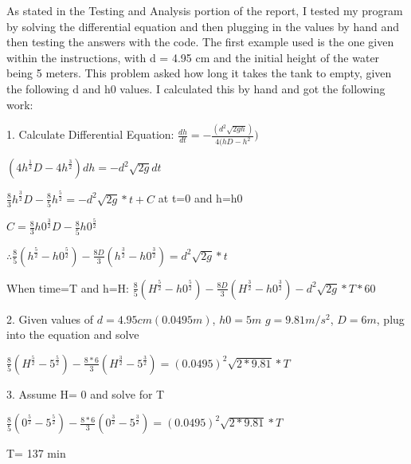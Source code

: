 \documentclass{article}
\begin{document}
{\color{black}  As stated in the Testing and Analysis portion of the report, I tested my program by solving the differential equation and then plugging in the values by hand and then testing the answers with the code.  The first example used is the one given within the instructions, with d = 4.95 cm and the initial height of the water being 5 meters.  This problem asked how long it takes the tank to empty, given the following d and h0 values.  I calculated this by hand and got the following work:
\par \medskip \par
1. Calculate Differential Equation:
$\frac{dh}{dt}=-\frac{(d^2\sqrt{2gh})}{4(hD-h^2})$
\par \medskip \par
$(4h^{\frac{1}{2}} D-4h^{\frac{3}{2}})dh= -d^{2} \sqrt{2g} dt$
\par \medskip \par
$\frac{8}{3} h^{\frac{3}{2}} D-\frac{8}{5} h^{\frac{5}{2}}=-d^2 \sqrt{2g}*t+C$ at t=0 and h=h0
\par \medskip \par
$C=\frac{8}{3} h0^{\frac{3}{2}} D-\frac{8}{5} h0^{\frac{5}{2}}$
\par \medskip \par
$\therefore \frac{8}{5} (h^{\frac{5}{2}}-h0^{\frac{5}{2}})-\frac{8D}{3} (h^{\frac{3}{2}}-h0^{\frac{3}{2}})=d^2 \sqrt{2g}*t$
\par \medskip \par
When time=T and h=H:  $\frac{8}{5} (H^{\frac{5}{2}}-h0^{\frac{5}{2}} )-\frac{8D}{3} (H^{\frac{3}{2}}-h0^{\frac{3}{2}} )-d^2 \sqrt{2g}*T*60$
\par \medskip \par
2. Given values of $d=4.95 cm (0.0495 m)$, $h0=5 m$ $g=9.81 m/s^2$, $D = 6 m$, plug into the equation and solve
\par \medskip \par
$\frac{8}{5} (H^{\frac{5}{2}}-5^{\frac{5}{2}})-\frac{8*6}{3} (H^{\frac{3}{2}}-5^{\frac{3}{2}} )=(0.0495)^2 \sqrt{2*9.81}*T$
\par \medskip \par
3. Assume H= 0 and solve for T
\par \medskip \par
$\frac{8}{5} (0^{\frac{5}{2}}-5^{\frac{5}{2}})-\frac{8*6}{3} (0^{\frac{3}{2}}-5^{\frac{3}{2}} )=(0.0495)^2 \sqrt{2*9.81}*T$
\par \medskip \par
T= 137 min
\par \medskip \par
}
\end{document}
